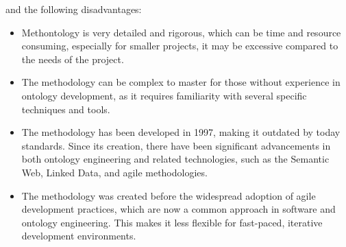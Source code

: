 and the following disadvantages:
\begin{itemize}
    \item Methontology is very detailed and rigorous, which can be time and resource consuming, especially for smaller projects, it may be excessive compared to the needs of the project.

    \item The methodology can be complex to master for those without experience in ontology development, as it requires familiarity with several specific techniques and tools.

    \item The methodology has been developed in 1997, making it outdated by today standards. Since its creation, there have been significant advancements in both ontology engineering and related technologies, such as the Semantic Web, Linked Data, and agile methodologies.

    \item The methodology was created before the widespread adoption of agile development practices, which are now a common approach in software and ontology engineering. This makes it less flexible for fast-paced, iterative development environments.
\end{itemize}


